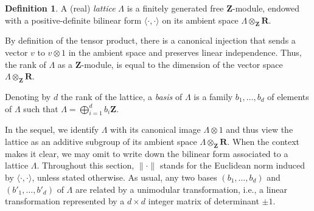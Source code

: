 \documentclass{amsart}
\newcommand{\vect}[1]{{#1}}
\newcommand{\inner}[2]{\langle \vect{#1},\vect{#2} \rangle}
\newcommand{\ZZ}{\mathbf{Z}}
\newcommand{\RR}{\mathbf{R}}
\newcommand{\Lat}{\Lambda}
\theoremstyle{definition}
\newtheorem{definition}[theorem]{Definition}
\begin{document}
\begin{definition}
  A (real) \emph{lattice}  $\Lat$ is a finitely generated free
  $\ZZ$-module,
  endowed with a positive-definite bilinear form $\inner{\cdot}{\cdot}$
  on its ambient space $\Lat\otimes_\ZZ \RR$.

  By definition of the tensor product, there is a canonical injection
  that sends a vector $v$ to $v\otimes 1$ in the ambient space and
  preserves linear independence.  Thus, the rank of $\Lat$ as a
  $\ZZ$-module, is equal to the dimension of the vector space
  $\Lat\otimes_\ZZ \RR$.

  Denoting by $d$ the rank of the lattice, a \emph{basis} of $\Lat$ is
  a family $b_1, \ldots, b_d$ of elements of $\Lat$ such that
  $\Lat = \bigoplus_{i=1}^d b_i \ZZ$.
\end{definition}
In the sequel, we identify $\Lat$ with its canonical image
$\Lat\otimes 1$ and thus view the lattice as an additive subgroup of
its ambient space $\Lat\otimes_\ZZ \RR$.  When the context makes it
clear, we may omit to write down the bilinear form associated to a
lattice $\Lat$.  Throughout this section, $\|\cdot\|$ stands for the
Euclidean norm induced by $\inner{\cdot}{\cdot}$, unless stated
otherwise.  As usual, any two bases $(b_1, \ldots, b_d)$ and
$(b'_1, \ldots, b'_d)$ of $\Lat$ are related by a unimodular
transformation, i.e., a linear transformation represented by a
$d\times d$ integer matrix of determinant $\pm 1$.
\end{document}
